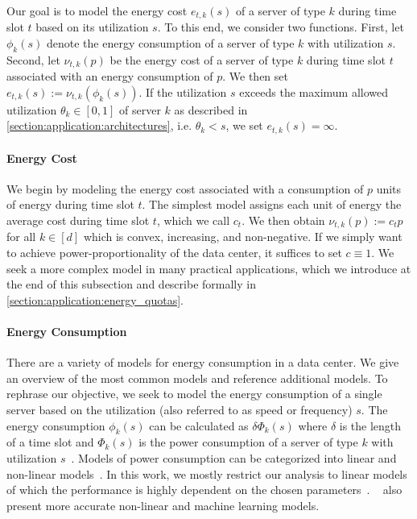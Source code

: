 Our goal is to model the energy cost $e_{t,k}(s)$ of a server of type $k$ during time slot $t$ based on its utilization $s$. To this end, we consider two functions. First, let $\phi_k(s)$ denote the energy consumption of a server of type $k$ with utilization $s$. Second, let $\nu_{t,k}(p)$ be the energy cost of a server of type $k$ during time slot $t$ associated with an energy consumption of $p$. We then set $e_{t,k}(s) := \nu_{t,k}(\phi_k(s))$. If the utilization $s$ exceeds the maximum allowed utilization $\theta_k \in [0,1]$ of server $k$ as described in \cref{section:application:architectures}, i.e. $\theta_k < s$, we set $e_{t,k}(s) = \infty$.

\paragraph{Energy Cost} We begin by modeling the energy cost associated with a consumption of $p$ units of energy during time slot $t$. The simplest model assigns each unit of energy the average cost during time slot $t$, which we call $c_t$. We then obtain $\nu_{t,k}(p) := c_t p$ for all $k \in [d]$ which is convex, increasing, and non-negative. If we simply want to achieve power-proportionality of the data center, it suffices to set $c \equiv 1$. We seek a more complex model in many practical applications, which we introduce at the end of this subsection and describe formally in \cref{section:application:energy_quotas}.

\paragraph{Energy Consumption} There are a variety of models for energy consumption in a data center. We give an overview of the most common models and reference additional models. To rephrase our objective, we seek to model the energy consumption of a single server based on the utilization (also referred to as speed or frequency) $s$. The energy consumption $\phi_k(s)$ can be calculated as $\delta \Phi_k(s)$ where $\delta$ is the length of a time slot and $\Phi_k(s)$ is the power consumption of a server of type $k$ with utilization $s$~\cite{Dayarathna2016}. Models of power consumption can be categorized into linear and non-linear models~\cite{Ismail2020}. In this work, we mostly restrict our analysis to linear models of which the performance is highly dependent on the chosen parameters~\cite{Ismail2020}. \citeauthor{Ismail2020}~\cite{Ismail2020} also present more accurate non-linear and machine learning models.

